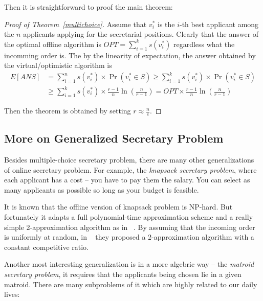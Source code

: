 Then it is straightforward to proof the main theorem:

\begin{proof}[Proof of Theorem~\ref{multichoice}]
    Assume that $v_i^*$ is the $i$-th best applicant among 
    the $n$ applicants applying for the secretarial positions.
    Clearly that the answer of the optimal offline algorithm is 
    $OPT = \sum_{i = 1}^{k} s(v_i^*)$ regardless 
    what the incomming order is.
    The by the linearity of expectation, the answer obtained by
    the virtual/optimistic algorithm is
    \begin{align*}
        E[ANS] &= \sum_{i = 1}^{n} s(v_i^*) \times \Pr(v_i^* \in S)
    \ge \sum_{i=1}^{k} s(v_i^*) \times \Pr(v_i^* \in S) \\
    &\ge \sum_{i=1}^{k} s(v_i^*) \times \frac{r-1}{n} \ln(\frac{n}{r-1})
    = OPT \times \frac{r-1}{n} \ln(\frac{n}{r-1})
    \end{align*}

    Then the theorem is obtained by setting $r \approx \frac{n}{e}$.
\end{proof}

\subsection{More on Generalized Secretary Problem}

Besides multiple-choice secretary problem, there are many other
generalizations of online secretary problem.
For example, the \emph{knapsack secretary problem}, where each applicant
has a cost -- you have to pay them the salary. You can select as many
applicants as possible so long as your budget is feasible.

It is known that the offline version of knapsack problem is NP-hard.
But fortunately it adapts a full polynomial-time approximation scheme
and a really simple 2-approximation algorithm 
as in ~\cite{vazirani2001approximation}.
By assuming that the incoming order is uniformly at random, 
in ~\cite{babaioff2007knapsack} they proposed a 2-approximation algorithm
with a constant competitive ratio.

Another most interesting generalization is in a more algebric way -- the
\emph{matroid secretary problem}, it requires that the applicants being
chosen lie in a given matroid. There are many subproblems of it which
are highly related to our daily lives:

